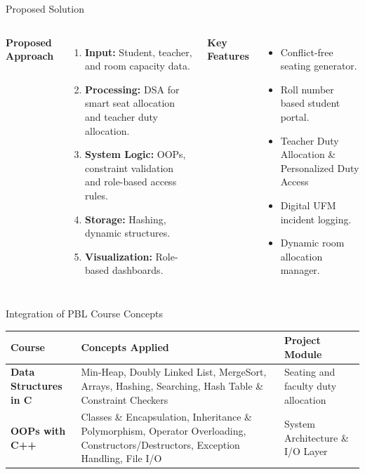 \documentclass[aspectratio=169,11pt]{beamer}
\begin{document}
\begin{frame}{Proposed Solution}
\begin{columns}[T,totalwidth=\textwidth]
\textbf{\color{GEUBlue}Proposed Approach}
\begin{enumerate}\itemsep3pt
\item \textbf{Input:} Student, teacher, and room capacity data.
\item \textbf{Processing:}  DSA for smart seat allocation and teacher duty allocation.
\item \textbf{System Logic:} OOPs, constraint validation and role-based access rules.
\item \textbf{Storage:} Hashing, dynamic structures.
\item \textbf{Visualization:} Role-based dashboards.
\end{enumerate}
\textbf{\color{GEUBlue}Key Features}
\begin{itemize}\itemsep3pt
\item Conflict-free seating generator.
\item Roll number based student portal.
\item Teacher Duty Allocation \& Personalized Duty Access
\item Digital UFM incident logging.
\item Dynamic room allocation manager.
\end{itemize}
\end{columns}
\end{frame}

\begin{frame}{Integration of PBL Course Concepts}
\scriptsize
\begin{center}
\renewcommand{\arraystretch}{1.25}
\begin{tabularx}{.98\textwidth}{@{}>{\bfseries}p{2.4cm}X p{2.8cm}@{}}
\toprule
Course & Concepts Applied & Project Module\\
\midrule
Data Structures in C & Min-Heap, Doubly Linked List, MergeSort, Arrays, Hashing, Searching, Hash Table \& Constraint Checkers & Seating and faculty duty allocation\\
\midrule
OOPs with C++ & Classes \& Encapsulation, Inheritance \& Polymorphism, Operator Overloading, Constructors/Destructors, Exception Handling, File I/O  & System Architecture \& I/O Layer\\
\bottomrule
\end{tabularx}
\end{center}
\end{frame}
\end{document}
